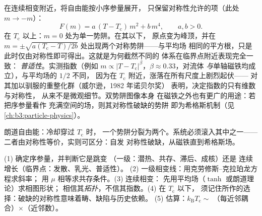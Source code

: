 \begin{proposition}[朗道理论]\label{prop:b3:phase-transitions:landau}
在连续相变附近，将自由能按小序参量展开，
只保留对称性允许的项（此处
$m \to -m$）：
\[
F(m) = a\,(T - T_{\text{c}})\,m^2 + b\,m^4 , \qquad a, b > 0 .
\]
在 $T_{\text{c}}$ 以上：$m = 0$ 处为单一势阱。在其以下，
原点变为峰顶，并在 $m = \pm
\sqrt{a(T_{\text{c}} - T)/2b}$ 处出现两个对称势阱——与平均场
相同的平方根，只是此时仅由对称性即可得出。这就是为何截然不同的
体系在临界点附近表现完全一致：
\emph{普适性}。实测指数（例如 $m \propto |T -
T_{\text{c}}|^\beta$，$\beta \approx 0.33$，对流体
\emph{与}单轴磁铁均成立），与平均场的 $1/2$ 不同，
因为在 $T_{\text{c}}$ 附近，涨落在所有尺度上剧烈起伏——
对其加以驯服的重整化群（威尔逊，1982 年诺贝尔奖）
表明，决定指数的只有维数与对称性，
从来不是微观细节。双势阱图像本身
在磁铁之外也有更广的用途：若把序参量看作
充满空间的场，则其对称性破缺的势阱
即为希格斯机制（见\cref{ch:b3:particle-physics}）。
\end{proposition}
\admitted

\begin{omfigure}

{\small 朗道自由能：冷却穿过 $T_{\text{c}}$ 时，
一个势阱分裂为两个。系统必须滚入其中之一——
二者由对称性等价，实则可区分：自发
对称性破缺，从磁铁直到希格斯场。}
\end{omfigure}

\begin{method}[判断相变]\label{met:b3:phase-transitions:method}
(1) 确定序参量，并判断它是跳变
（一级：潜热、共存、滞后、成核）还是
连续增长（临界点：发散、乳光、普适性）。
(2) 一级相变线：用克劳修斯–克拉珀龙方程求斜率；
用 $\mu$ 相等求共存条件。(3) 连续相变：
先用平均场（$\tanh$ 或朗道理论）求相图形状；
相信其\emph{拓扑}，不信其指数。(4) 在 $T_{\text{c}}$ 以下，
须记住所作的选择：破缺的对称性意味着畴、缺陷与历史依赖。
(5) 估算：$k_{\text{B}}T_{\text{c}} \sim$
（每近邻耦合）$\times$（近邻数）。
\end{method}

